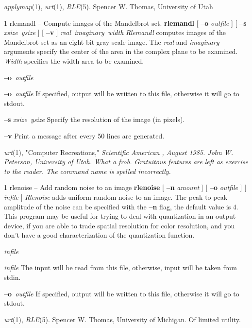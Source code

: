 {\it applymap}{\rm (1),}
{\it urt}{\rm (1),}
{\it RLE}{\rm (5).}
Spencer W. Thomas, University of Utah
\newpage


%
%
%
 1
rlemandl -- Compute images of the Mandelbrot set.
{\bf rlemandl} 
[ 
{\bf --o}
{\it outfile}
] [
{\bf --s}
{\it xsize\ ysize}
] [
{\bf --v}
]
{\it real\ imaginary\ width}
{\it Rlemandl}
computes images of the Mandelbrot set as an eight bit gray scale image.
The
{\it real}
and
{\it imaginary}
arguments specify the center of the area in the complex plane to be examined.
{\it Width}
specifies the width area to be examined.
\begin{TPlist}{{\bf --o}{\it \ outfile}
}
\item[{{\bf --o}{\it \ outfile}
}]
If specified, output will be written to this file, otherwise it will
go to stdout.
\item[{{\bf --s} }]
{\it xsize\ ysize}
Specify the resolution of the image (in pixels).
\item[{{\bf --v}}]
Print a message after every 50 lines are generated.
\end{TPlist}
{\it urt}{\rm (1),}
\nwl
"Computer Recreations," %
\it Scientific American\rm%
, August 1985.
John W. Peterson, University of Utah.
What a frob.  Gratuitous features are left as exercise to the reader.
The command name is spelled incorrectly.
\newpage


%
%
%
 1
rlenoise -- Add random noise to an image
{\bf rlenoise}
[
{\bf --n}
{\it amount}
] [
{\bf --o}
{\it outfile}
] [ 
{\it infile}
] 
{\it Rlenoise}
adds uniform random noise to an image.  The peak-to-peak amplitude of
the noise can be specified with the
{\bf --n}
flag, the default value is 4.  This program may be
useful for trying to deal with quantization in an output device, if
you are able to trade spatial resolution for color resolution, and you
don't have a good characterization of the quantization function.
\begin{TPlist}{{\it infile}}
\item[{{\it infile}}]
The input will be read from this file, otherwise, input will
be taken from stdin.
\item[{{\bf --o}{\it \ outfile}
}]
If specified, output will be written to this file, otherwise it will
go to stdout.
\end{TPlist}
{\it urt}{\rm (1),}
{\it RLE}{\rm (5).}
Spencer W. Thomas, University of Michigan.
Of limited utility.

